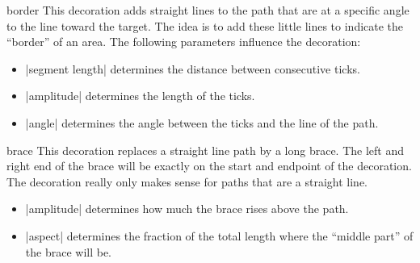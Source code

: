 \begin{decoration}{border}
    This decoration adds straight lines to the path that are at a specific
    angle to the line toward the target. The idea is to add these little lines
    to indicate the ``border'' of an area. The following parameters influence
    the decoration:
    \begin{itemize}
        \item |segment length| determines the distance between consecutive
            ticks.
        \item |amplitude| determines the length of the ticks.
        \item |angle| determines the angle between the ticks and the line of
            the path.
    \end{itemize}
\begin{codeexample}[preamble={\usetikzlibrary{decorations.pathreplacing}}]
\end{codeexample}
\end{decoration}

\begin{decoration}{brace}
    This decoration replaces a straight line path by a long brace. The left and
    right end of the brace will be exactly on the start and endpoint of the
    decoration. The decoration really only makes sense for paths that are a
    straight line.
    \begin{itemize}
        \item |amplitude| determines how much the brace rises above the path.
        \item |aspect| determines the fraction of the total length where the
            ``middle part'' of the brace will be.
    \end{itemize}
\begin{codeexample}[preamble={\usetikzlibrary{decorations.pathreplacing}}]
\end{codeexample}
\end{decoration}

